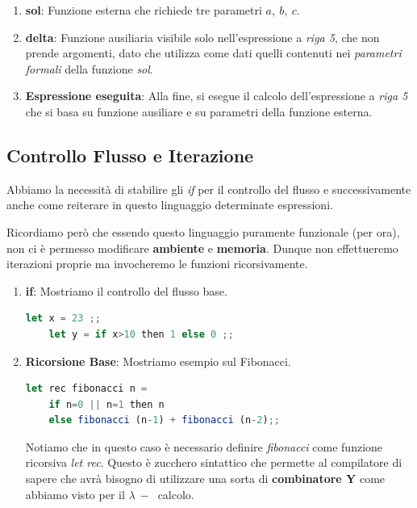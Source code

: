 \documentclass{article}
\begin{document}
\begin{enumerate}
    \item \textbf{sol}: Funzione esterna che richiede tre parametri $a,\: b,\: c$.
    \item \textbf{delta}: Funzione ausiliaria visibile solo nell'espressione a \textit{riga 5}, che non prende argomenti, dato che utilizza come dati quelli contenuti nei \textit{parametri formali} della funzione \textit{sol}.
    \item \textbf{Espressione eseguita}: Alla fine, si esegue il calcolo dell'espressione a \textit{riga 5} che si basa su funzione ausiliare e su parametri della funzione esterna.
\end{enumerate}

\newpage

\subsection{Controllo Flusso e Iterazione}

Abbiamo la necessità di stabilire gli \textit{if} per il controllo del flusso
e successivamente anche come reiterare in questo linguaggio determinate espressioni.

Ricordiamo però che essendo questo linguaggio puramente funzionale (per ora), non ci è permesso modificare \textbf{ambiente} e \textbf{memoria}. Dunque non effettueremo iterazioni proprie ma invocheremo le funzioni ricorsivamente.

\begin{enumerate}
    \item \textbf{if}: Mostriamo il controllo del flusso base.
    \vspace*{10px}
    \begin{lstlisting}[language = JavaScript]
    let x = 23 ;;
    let y = if x>10 then 1 else 0 ;;  
    \end{lstlisting}
    \vspace*{-10px}

    \item \textbf{Ricorsione Base}: Mostriamo esempio sul Fibonacci.
    \vspace*{10px}
    \begin{lstlisting}[language = JavaScript]
    let rec fibonacci n =
    if n=0 || n=1 then n
    else fibonacci (n-1) + fibonacci (n-2);;
    \end{lstlisting}
    \vspace*{-10px}
    Notiamo che in questo caso è necessario definire \textit{fibonacci} come funzione ricorsiva \textit{let rec}. Questo è zucchero sintattico che permette al compilatore di sapere che avrà bisogno di utilizzare una sorta di \textbf{combinatore Y} come abbiamo visto per il $\lambda \: - \: $ calcolo.
\end{enumerate}
\end{document}

